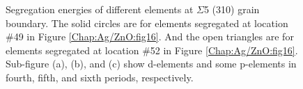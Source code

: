 \begingroup
\begin{figure}[!ht]
  \centering
\caption[Segregation energies of different elements at $\Sigma$5 (310) grain boundary.]{Segregation energies of different elements at $\Sigma$5 (310) grain boundary. The solid circles are for elements segregated at location \#49 in Figure \ref{Chap:Ag/ZnO:fig16}. And the open triangles are for elements segregated at location \#52 in Figure \ref{Chap:Ag/ZnO:fig16}. Sub-figure (a), (b), and (c) show d-elements and some p-elements in fourth, fifth, and sixth periods, respectively.}
\label{Chap:Ag/ZnO:fig17}
\end{figure}
\endgroup



